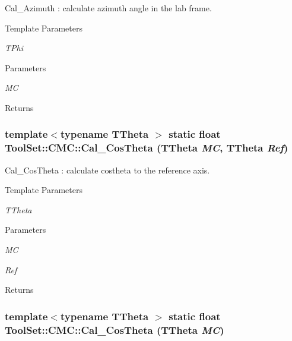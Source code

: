 Cal\_\-Azimuth : calculate azimuth angle in the lab frame. 
\begin{DoxyTemplParams}{Template Parameters}
\item[{\em TPhi}]\end{DoxyTemplParams}

\begin{DoxyParams}{Parameters}
\item[{\em MC}]\end{DoxyParams}
\begin{DoxyReturn}{Returns}

\end{DoxyReturn}
\hypertarget{classToolSet_1_1CMC_a91c74f61d1c9656e68f4b1037976a51b}{
\subsubsection[{Cal\_\-CosTheta}]{\setlength{\rightskip}{0pt plus 5cm}template$<$typename TTheta $>$ static float ToolSet::CMC::Cal\_\-CosTheta (TTheta {\em MC}, \/  TTheta {\em Ref})}}
\label{classToolSet_1_1CMC_a91c74f61d1c9656e68f4b1037976a51b}


Cal\_\-CosTheta : calculate costheta to the reference axis. 
\begin{DoxyTemplParams}{Template Parameters}
\item[{\em TTheta}]\end{DoxyTemplParams}

\begin{DoxyParams}{Parameters}
\item[{\em MC}]\item[{\em Ref}]\end{DoxyParams}
\begin{DoxyReturn}{Returns}

\end{DoxyReturn}
\hypertarget{classToolSet_1_1CMC_a7142700aa3c1b586b976e9d71301c7bc}{
\subsubsection[{Cal\_\-CosTheta}]{\setlength{\rightskip}{0pt plus 5cm}template$<$typename TTheta $>$ static float ToolSet::CMC::Cal\_\-CosTheta (TTheta {\em MC})}}
\label{classToolSet_1_1CMC_a7142700aa3c1b586b976e9d71301c7bc}


